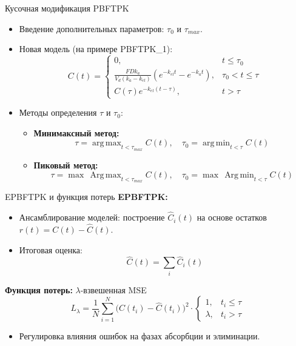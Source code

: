 \documentclass{beamer}
\DeclareMathOperator*{\argmax}{arg\,max}
\DeclareMathOperator*{\argmin}{arg\,min}
\DeclareMathOperator*{\Argmax}{Arg\,max}
\DeclareMathOperator*{\Argmin}{Arg\,min}
\begin{document}
\begin{frame}{Кусочная модификация PBFTPK}
	\begin{itemize}
		\item Введение дополнительных параметров: \( \tau_0 \) и \( \tau_{max} \).
		\item Новая модель (на примере PBFTPK\_1):
		      \[
			      C(t) = \begin{cases}
				      0,                                                             & t \le \tau_0        \\
				      \frac{FD k_a}{V_d (k_a - k_{el})} (e^{-k_{el}t} - e^{-k_a t}), & \tau_0 < t \le \tau \\
				      C(\tau)e^{-k_{el}(t-\tau)},                                    & t > \tau
			      \end{cases}
		      \]
		\item Методы определения \( \tau \) и \( \tau_0 \):
		      \begin{itemize}
			      \item \textbf{Минимаксный метод:}
			            \[
				            \tau = \argmax_{t < \tau_{max}} C(t), \quad \tau_0 = \argmin_{t < \tau} C(t)
			            \]
			      \item \textbf{Пиковый метод:}
			            \[
				            \tau = \max\,\Argmax_{t < \tau_{max}} C(t), \quad \tau_0 = \max\,\Argmin_{t < \tau} C(t)
			            \]
		      \end{itemize}
	\end{itemize}
\end{frame}

\begin{frame}{EPBFTPK и функция потерь}
	\textbf{EPBFTPK:}
	\begin{itemize}
		\item Ансамблирование моделей: построение \(\hat{C}_i(t)\) на основе остатков \(r(t) = C(t) - \hat{C}(t)\).
		\item Итоговая оценка:
		      \[
			      \hat{C}(t) = \sum_i \hat{C}_i(t)
		      \]
	\end{itemize}
	\vspace{0.5em}
	\textbf{Функция потерь:} \(\lambda\)-взвешенная MSE
	\[
		L_{\lambda} = \frac{1}{N}\sum_{i=1}^{N} \Big(C(t_i)-\hat{C}(t_i)\Big)^2 \cdot
		\begin{cases}
			1,       & t_i \le \tau \\
			\lambda, & t_i > \tau
		\end{cases}
	\]
	\begin{itemize}
		\item Регулировка влияния ошибок на фазах абсорбции и элиминации.
	\end{itemize}
\end{frame}
\end{document}
